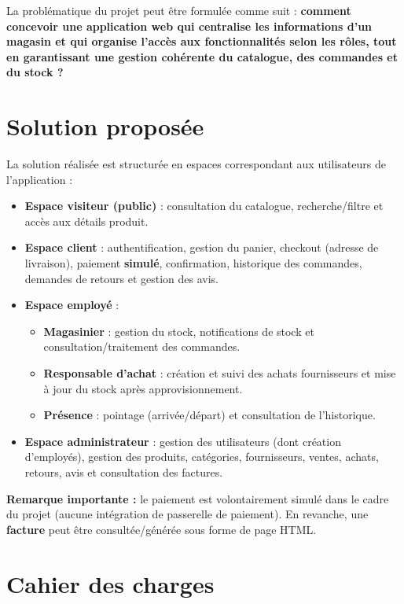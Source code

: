 \documentclass[12pt,a4paper]{report}
\begin{document}
La problématique du projet peut être formulée comme suit : \textbf{comment concevoir une application web qui centralise les informations d’un magasin et qui organise l’accès aux fonctionnalités selon les rôles, tout en garantissant une gestion cohérente du catalogue, des commandes et du stock ?}

\section{Solution proposée}
La solution réalisée est structurée en espaces correspondant aux utilisateurs de l’application :
\begin{itemize}
    \item \textbf{Espace visiteur (public)} : consultation du catalogue, recherche/filtre et accès aux détails produit.
    \item \textbf{Espace client} : authentification, gestion du panier, checkout (adresse de livraison), paiement \textbf{simulé}, confirmation, historique des commandes, demandes de retours et gestion des avis.
    \item \textbf{Espace employé} :
    \begin{itemize}
        \item \textbf{Magasinier} : gestion du stock, notifications de stock et consultation/traitement des commandes.
        \item \textbf{Responsable d'achat} : création et suivi des achats fournisseurs et mise à jour du stock après approvisionnement.
        \item \textbf{Présence} : pointage (arrivée/départ) et consultation de l’historique.
    \end{itemize}
    \item \textbf{Espace administrateur} : gestion des utilisateurs (dont création d’employés), gestion des produits, catégories, fournisseurs, ventes, achats, retours, avis et consultation des factures.
\end{itemize}

\textbf{Remarque importante :} le paiement est volontairement simulé dans le cadre du projet (aucune intégration de passerelle de paiement). En revanche, une \textbf{facture} peut être consultée/générée sous forme de page HTML.

\section{Cahier des charges}
\end{document}
